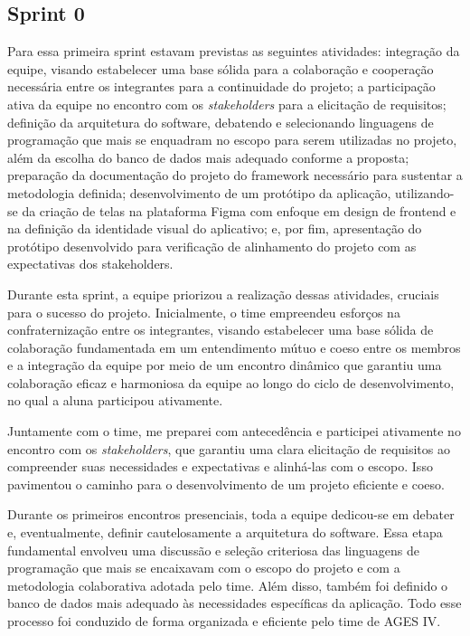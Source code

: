 \subsection{Sprint 0}

Para essa primeira sprint estavam previstas as seguintes atividades: integração da equipe, visando estabelecer uma base sólida para a colaboração e cooperação necessária entre os integrantes para a continuidade do projeto; a participação ativa da equipe no encontro com os \textit{stakeholders} para a elicitação de requisitos; definição da arquitetura do software, debatendo e selecionando linguagens de programação que mais se enquadram no escopo para serem utilizadas no projeto, além da escolha do banco de dados mais adequado conforme a proposta; preparação da documentação do projeto do framework necessário para sustentar a metodologia definida; desenvolvimento de um protótipo da aplicação, utilizando-se da criação de telas na plataforma Figma com enfoque em design de frontend e na definição da identidade visual do aplicativo; e, por fim, apresentação do protótipo desenvolvido para verificação de alinhamento do projeto com as expectativas dos stakeholders.

Durante esta sprint, a equipe priorizou a realização dessas atividades, cruciais para o sucesso do projeto. Inicialmente, o time empreendeu esforços na confraternização entre os integrantes, visando estabelecer uma base sólida de colaboração fundamentada em um entendimento mútuo e coeso entre os membros e a integração da equipe por meio de um encontro dinâmico que garantiu uma colaboração eficaz e harmoniosa da equipe ao longo do ciclo de desenvolvimento, no qual a aluna participou ativamente.

Juntamente com o time, me preparei com antecedência e participei ativamente no encontro com os \textit{stakeholders}, que garantiu uma clara elicitação de requisitos ao compreender suas necessidades e expectativas e alinhá-las com o escopo. Isso pavimentou o caminho para o desenvolvimento de um projeto eficiente e coeso.

Durante os primeiros encontros presenciais, toda a equipe dedicou-se em debater e, eventualmente, definir cautelosamente a arquitetura do software. Essa etapa fundamental envolveu uma discussão e seleção criteriosa das linguagens de programação que mais se encaixavam com o escopo do projeto e com a metodologia colaborativa adotada pelo time. Além disso, também foi definido o banco de dados mais adequado às necessidades específicas da aplicação. Todo esse processo foi conduzido de forma organizada e eficiente pelo time de AGES IV. 

